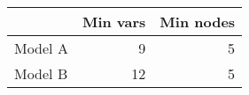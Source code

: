 
\begin{tabular}{l|r|r}
\hline
  & Min vars & Min nodes\\
\hline
Model A & 9 & 5\\
\hline
Model B & 12 & 5\\
\hline
\end{tabular}